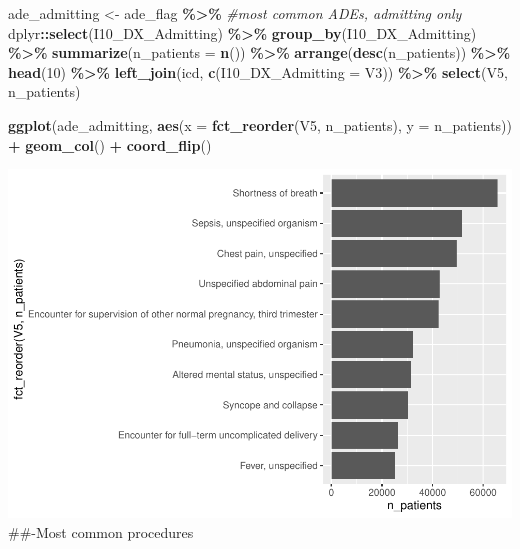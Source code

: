 \documentclass[preprint, 3p,
authoryear]{elsarticle} %
\newenvironment{Shaded}{\begin{snugshade}}{\end{snugshade}}
\newcommand{\CommentTok}[1]{\textcolor[rgb]{0.56,0.35,0.01}{\textit{#1}}}
\newcommand{\DataTypeTok}[1]{\textcolor[rgb]{0.13,0.29,0.53}{#1}}
\newcommand{\DecValTok}[1]{\textcolor[rgb]{0.00,0.00,0.81}{#1}}
\newcommand{\KeywordTok}[1]{\textcolor[rgb]{0.13,0.29,0.53}{\textbf{#1}}}
\newcommand{\NormalTok}[1]{#1}
\newcommand{\OperatorTok}[1]{\textcolor[rgb]{0.81,0.36,0.00}{\textbf{#1}}}
\newcommand{\StringTok}[1]{\textcolor[rgb]{0.31,0.60,0.02}{#1}}
\begin{document}
\begin{Shaded}
\begin{Highlighting}[]
\NormalTok{ade\_admitting \textless{}{-}}\StringTok{ }\NormalTok{ade\_flag }\OperatorTok{\%\textgreater{}\%}\StringTok{ }\CommentTok{\#most common ADEs, admitting only}
\StringTok{  }\NormalTok{dplyr}\OperatorTok{::}\KeywordTok{select}\NormalTok{(I10\_DX\_Admitting) }\OperatorTok{\%\textgreater{}\%}
\StringTok{  }\KeywordTok{group\_by}\NormalTok{(I10\_DX\_Admitting) }\OperatorTok{\%\textgreater{}\%}
\StringTok{  }\KeywordTok{summarize}\NormalTok{(}\DataTypeTok{n\_patients =} \KeywordTok{n}\NormalTok{()) }\OperatorTok{\%\textgreater{}\%}
\StringTok{  }\KeywordTok{arrange}\NormalTok{(}\KeywordTok{desc}\NormalTok{(n\_patients)) }\OperatorTok{\%\textgreater{}\%}
\StringTok{  }\KeywordTok{head}\NormalTok{(}\DecValTok{10}\NormalTok{) }\OperatorTok{\%\textgreater{}\%}
\StringTok{  }\KeywordTok{left\_join}\NormalTok{(icd, }\KeywordTok{c}\NormalTok{(}\StringTok{\textquotesingle{}I10\_DX\_Admitting\textquotesingle{}}\NormalTok{ =}\StringTok{ \textquotesingle{}V3\textquotesingle{}}\NormalTok{)) }\OperatorTok{\%\textgreater{}\%}
\StringTok{  }\KeywordTok{select}\NormalTok{(V5, n\_patients)}

\KeywordTok{ggplot}\NormalTok{(ade\_admitting, }\KeywordTok{aes}\NormalTok{(}\DataTypeTok{x =} \KeywordTok{fct\_reorder}\NormalTok{(V5, n\_patients), }\DataTypeTok{y =}\NormalTok{ n\_patients)) }\OperatorTok{+}
\StringTok{  }\KeywordTok{geom\_col}\NormalTok{() }\OperatorTok{+}
\StringTok{  }\KeywordTok{coord\_flip}\NormalTok{()}
\end{Highlighting}
\end{Shaded}

\includegraphics{final-project-paper_files/figure-latex/dx-admitting-1.pdf}
\#\#-Most common procedures
\end{document}
